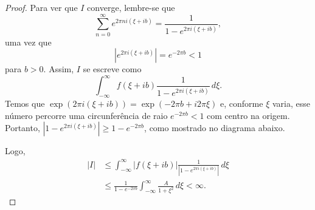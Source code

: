 \begin{proof}
        Para ver que $I$ converge, lembre-se que
        \begin{equation*}
            \sum_{n=0}^{\infty} e^{2\pi n i(\xi + ib)} = \frac{1}{1 - e^{2\pi i(\xi + ib)}},
        \end{equation*}
        uma vez que
        \begin{equation*}
            |e^{2\pi i(\xi + ib)}| = e^{-2\pi b} < 1
        \end{equation*}
        para $b > 0$. Assim, $I$ se escreve como
        \begin{equation*}
            \int_{-\infty}^{\infty} f(\xi + ib)\frac{1}{1 - e^{2\pi i(\xi + ib)}}\,d\xi.
        \end{equation*}
        Temos que $\exp(2\pi i (\xi + ib)) = \exp(-2\pi b + i2\pi \xi)$ e, 
        conforme $\xi$ varia, esse número percorre uma circunferência de raio 
        $e^{-2\pi b} < 1$ com centro na origem. Portanto, 
        $|1 - e^{2\pi i(\xi + ib)}| \geq 1 - e^{-2\pi b}$, como mostrado no 
        diagrama abaixo.
        \begin{figure}[H]
            \centering
        \end{figure}
        Logo,
        \begin{align*}
            |I| &\leq \int_{-\infty}^{\infty}|f(\xi + ib)|\frac{1}{|1 - e^{2\pi i(\xi + ib)}|} \, d\xi \\
            &\leq \frac{1}{1 - e^{-2\pi b}}\int_{-\infty}^{\infty} \frac{A}{1 + \xi^2} \, d\xi < \infty.

\end{align*}
\end{proof}
